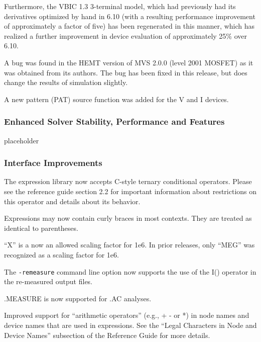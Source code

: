 \documentclass[letterpaper]{scrartcl}
\begin{document}
\begin{XyceItemize}
  Furthermore, the VBIC 1.3 3-terminal model, which had previously had
  its derivatives optimized by hand in \Xyce{} 6.10 (with a resulting
  performance improvement of approximately a factor of five) has been
  regenerated in this manner, which has realized a further improvement
  in device evaluation of approximately 25\% over \Xyce{} 6.10.
\item A bug was found in the HEMT version of MVS 2.0.0 (level 2001
  MOSFET) as it was obtained from its authors.  The bug has been fixed
  in this release, but does change the results of simulation slightly.
\item A new pattern (PAT) source function was added for the V
and I devices.
\end{XyceItemize}

\subsubsection*{Enhanced Solver Stability, Performance and Features}
\begin{XyceItemize}
\item placeholder
\end{XyceItemize}

\subsubsection*{Interface Improvements}
\begin{XyceItemize}
\item The \Xyce{} expression library now accepts C-style ternary
  conditional operators.  Please see the reference guide section 2.2
  for important information about restrictions on this operator and
  details about its behavior.
\item Expressions may now contain curly braces in most contexts.  They
  are treated as identical to parentheses.
\item ``X'' is a now an allowed scaling factor for 1e6.  In prior \Xyce{}
  releases, only ``MEG'' was recognized as a scaling factor for 1e6.
\item The \texttt{-remeasure} command line option now supports the use 
of the I() operator in the re-measured output files.
\item .MEASURE is now supported for .AC analyses.
\item Improved support for ``arithmetic operators'' (e.g., + - or *) in node names
and device names that are used in expressions. See the ``Legal Characters in Node
and Device Names'' subsection of the \Xyce{} Reference Guide for more details.
\end{XyceItemize}
\end{document}
